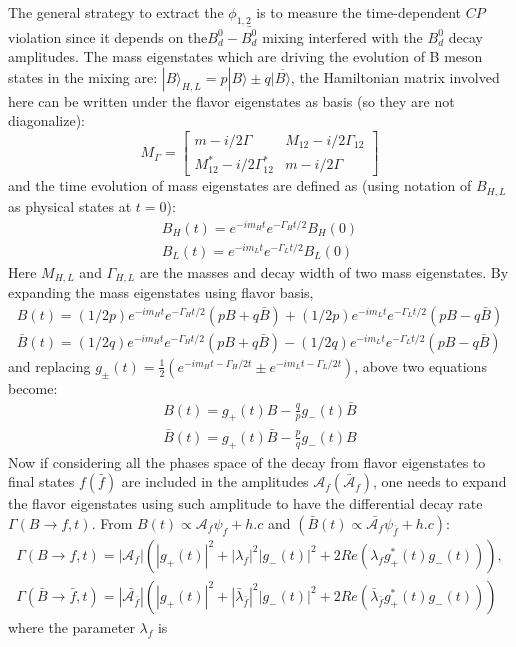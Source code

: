 The general strategy to extract the $\phi_{1,2}$ is to measure the time-dependent $CP$ violation since it depends on the$B_d^0-\bar{B_d^0}$ mixing interfered with the $B_d^0$ decay amplitudes.
The mass eigenstates which are driving the evolution of B meson states in the mixing are: $|B\rangle_{H,L}=p|B\rangle \pm q{|\overline{B\rangle}}$, the Hamiltonian matrix involved here can be written under the flavor eigenstates as basis (so they are not diagonalize): 
\begin{equation}
M_\Gamma=
\begin{bmatrix}
m-i/2\Gamma & M_{12}-i/2\Gamma_{12}\\
M^*_{12}-i/2\Gamma^*_{12}& m-i/2\Gamma 
\end{bmatrix}
\end{equation}
and the time evolution of mass eigenstates are defined as (using notation of $B_{H,L}$ as physical states at $t = 0$): 
\begin{eqnarray}
B_H(t)=e^{-im_Ht}e^{-\Gamma_Ht/2}B_H(0)\\
B_L(t)=e^{-im_Lt}e^{-\Gamma_Lt/2}B_L(0)
\end{eqnarray}
Here $M_{H,L}$ and $\Gamma_{H,L}$ are the masses and decay width of two mass eigenstates. By expanding the mass eigenstates using flavor basis, 
\begin{eqnarray}
B(t)=(1/2p)e^{-im_Ht}e^{-\Gamma_Ht/2}(pB+q\bar{B})+(1/2p)e^{-im_Lt}e^{-\Gamma_Lt/2}(pB-q\bar{B})\\
\bar{B}(t)=(1/2q)e^{-im_Ht}e^{-\Gamma_Ht/2}(pB+q\bar{B})-(1/2q)e^{-im_Lt}e^{-\Gamma_Lt/2}(pB-q\bar{B})
\end{eqnarray}
and replacing $g_{\pm}(t)=\frac{1}{2}(e^{-im_Ht-\Gamma_H/2t}\pm e^{-im_Lt-\Gamma_L/2t})$, above two equations become:
\begin{eqnarray}
B(t)=g_{+}(t)B-\frac{q}{p}g_{-}(t)\bar{B}\\
\bar{B}(t)=g_{+}(t)\bar{B}-\frac{p}{q}g_{-}(t){B}
\end{eqnarray}
Now if considering all the phases space of the decay from flavor eigenstates to final states $f(\bar{f})$ are included in the amplitudes $\mathcal{A}_f (\bar{\mathcal{A}}_f)$, one needs to expand the flavor eigenstates using such amplitude to have the differential decay rate $\Gamma(B\to f,t)$. From $B(t) \propto \mathcal{A}_f\psi_f+h.c $ and $ (\bar{B}(t) \propto \bar{\mathcal{A}_f}\psi_{\bar{f}}+h.c)$:
\begin{eqnarray}
\Gamma(B\to f,t)=|\mathcal{A}_f|(|g_+(t)|^2+|\lambda_f|^2|g_-(t)|^2+2Re(\lambda_f g^*_+(t)g_-(t))),\\
\Gamma(\bar{B}\to \bar{f},t)=|\bar{\mathcal{A}_{\bar{f}}}|(|g_+(t)|^2+|\bar{\lambda}_{\bar{f}}|^2|g_-(t)|^2+2Re(\bar{\lambda}_{\bar{f}} g^*_+(t)g_-(t)))
\end{eqnarray} where the parameter $\lambda_f$ is
